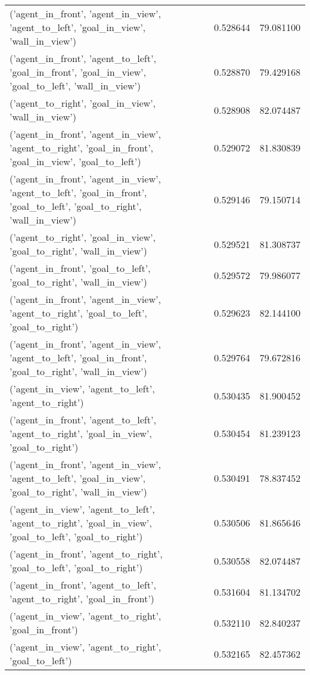 \begin{tabular}{lrr}
('agent\_in\_front', 'agent\_in\_view', 'agent\_to\_left', 'goal\_in\_view', 'wall\_in\_view') & 0.528644 & 79.081100 \\
('agent\_in\_front', 'agent\_to\_left', 'goal\_in\_front', 'goal\_in\_view', 'goal\_to\_left', 'wall\_in\_view') & 0.528870 & 79.429168 \\
('agent\_to\_right', 'goal\_in\_view', 'wall\_in\_view') & 0.528908 & 82.074487 \\
('agent\_in\_front', 'agent\_in\_view', 'agent\_to\_right', 'goal\_in\_front', 'goal\_in\_view', 'goal\_to\_left') & 0.529072 & 81.830839 \\
('agent\_in\_front', 'agent\_in\_view', 'agent\_to\_left', 'goal\_in\_front', 'goal\_to\_left', 'goal\_to\_right', 'wall\_in\_view') & 0.529146 & 79.150714 \\
('agent\_to\_right', 'goal\_in\_view', 'goal\_to\_right', 'wall\_in\_view') & 0.529521 & 81.308737 \\
('agent\_in\_front', 'goal\_to\_left', 'goal\_to\_right', 'wall\_in\_view') & 0.529572 & 79.986077 \\
('agent\_in\_front', 'agent\_in\_view', 'agent\_to\_right', 'goal\_to\_left', 'goal\_to\_right') & 0.529623 & 82.144100 \\
('agent\_in\_front', 'agent\_in\_view', 'agent\_to\_left', 'goal\_in\_front', 'goal\_to\_right', 'wall\_in\_view') & 0.529764 & 79.672816 \\
('agent\_in\_view', 'agent\_to\_left', 'agent\_to\_right') & 0.530435 & 81.900452 \\
('agent\_in\_front', 'agent\_to\_left', 'agent\_to\_right', 'goal\_in\_view', 'goal\_to\_right') & 0.530454 & 81.239123 \\
('agent\_in\_front', 'agent\_in\_view', 'agent\_to\_left', 'goal\_in\_view', 'goal\_to\_right', 'wall\_in\_view') & 0.530491 & 78.837452 \\
('agent\_in\_view', 'agent\_to\_left', 'agent\_to\_right', 'goal\_in\_view', 'goal\_to\_left', 'goal\_to\_right') & 0.530506 & 81.865646 \\
('agent\_in\_front', 'agent\_to\_right', 'goal\_to\_left', 'goal\_to\_right') & 0.530558 & 82.074487 \\
('agent\_in\_front', 'agent\_to\_left', 'agent\_to\_right', 'goal\_in\_front') & 0.531604 & 81.134702 \\
('agent\_in\_view', 'agent\_to\_right', 'goal\_in\_front') & 0.532110 & 82.840237 \\
('agent\_in\_view', 'agent\_to\_right', 'goal\_to\_left') & 0.532165 & 82.457362 \\

\end{tabular}
